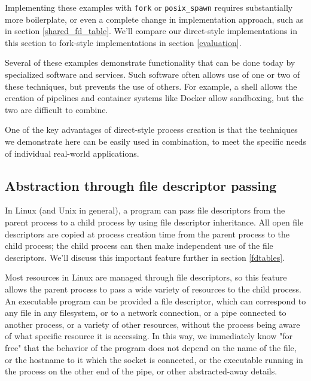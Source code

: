\documentclass[letterpaper,twocolumn,10pt]{article}
\begin{document}
Implementing these examples with \texttt{fork} or \verb|posix_spawn| requires substantially more boilerplate,
or even a complete change in implementation approach,
such as in section \ref{shared_fd_table}.
We'll compare our direct-style implementations in this section
to fork-style implementations
in section \ref{evaluation}.

Several of these examples demonstrate functionality that can be done today by specialized software and services.
Such software often allows use of one or two of these techniques, but prevents the use of others.
For example, a shell allows the creation of pipelines and container systems like Docker allow sandboxing,
but the two are difficult to combine.

One of the key advantages of direct-style process creation is that the techniques we demonstrate here
can be easily used in combination,
to meet the specific needs of individual real-world applications.
\subsection{Abstraction through file descriptor passing}\label{fd_abstraction}
In Linux (and Unix in general),
a program can pass file descriptors from the parent process to a child process
by using file descriptor inheritance.
All open file descriptors are copied at process creation time from the parent process to the child process;
the child process can then make independent use of the file descriptors.
We'll discuss this important feature further in section \ref{fdtables}.

Most resources in Linux are managed through file descriptors,
so this feature allows the parent process to pass a wide variety of resources to the child process.
An executable program can be provided a file descriptor,
which can correspond to any file in any filesystem,
or to a network connection\cite{ucspi},
or a pipe connected to another process,
or a variety of other resources,
without the process being aware of what specific resource it is accessing.
In this way, we immediately know "for free"\cite{theoremsforfree}
that the behavior of the program does not depend on the name of the file,
or the hostname to it which the socket is connected,
or the executable running in the process on the other end of the pipe,
or other abstracted-away details.
\end{document}
